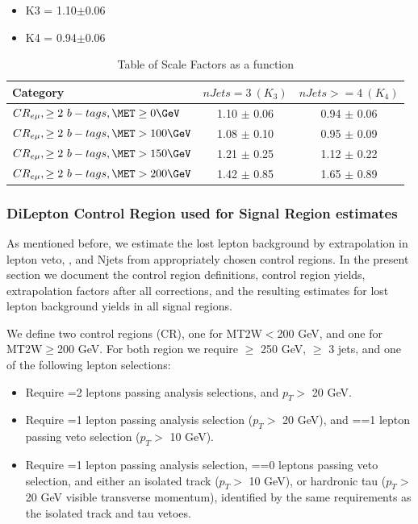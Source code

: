 \begin{itemize}
  \item K3 = 1.10$\pm$0.06
  \item K4 = 0.94$\pm$0.06
\end{itemize}

\begin{table}[htb]
\begin{center}
\small
\caption{\label{tab:emu_CR:SF} Table of Scale Factors as a function \MET}
\begin{tabular}{|l|c|c|} \hline
Category & $nJets=3~(K_{3})$ & $nJets>=4~(K_{4})$ \\ \hline
$CR_{e\mu}, \ge2~b-tags, \MET\ge0\GeV$  & 1.10 $\pm$ 0.06 & 0.94 $\pm$ 0.06\\ \hline
$CR_{e\mu}, \ge2~b-tags, \MET>100\GeV$  & 1.08 $\pm$ 0.10 & 0.95 $\pm$ 0.09\\ \hline
$CR_{e\mu}, \ge2~b-tags, \MET>150\GeV$  & 1.21 $\pm$ 0.25 & 1.12 $\pm$ 0.22\\ \hline
$CR_{e\mu}, \ge2~b-tags, \MET>200\GeV$  & 1.42 $\pm$ 0.85 & 1.65 $\pm$ 0.89\\ \hline
\end{tabular}
\end{center}
\end{table}

\subsubsection{DiLepton Control Region used for Signal Region estimates}
\label{sec:bkgLL:highMET_CR}
 
As mentioned before, we estimate the lost lepton background by extrapolation 
in lepton veto, \MET, and Njets from appropriately chosen control regions.  
In the present section we document the control region definitions, control region yields, extrapolation
factors after all corrections, and the resulting estimates for lost lepton background yields in all signal regions.

We define two control regions (CR), one for MT2W$<$200 GeV, and one for MT2W$\ge$200 GeV.
For both region we require \MET $\ge$ 250 GeV, $\ge $ 3 jets, and one of the following lepton selections:

\begin{itemize}
    \item Require =2 leptons passing analysis selections, and $p_{T} >$ 20 GeV.
    \item Require =1 lepton passing analysis selection ($p_{T}>$ 20 GeV), and ==1 lepton passing veto selection ($p_{T}>$ 10 GeV).
    \item Require =1 lepton passing analysis selection, ==0 leptons passing veto selection, 
          and either an isolated track ($p_{T}>$ 10 GeV), or hardronic tau ($p_{T}>$ 20 GeV visible transverse momentum), 
          identified by the same requirements as the isolated track and tau vetoes.  
\end{itemize}

